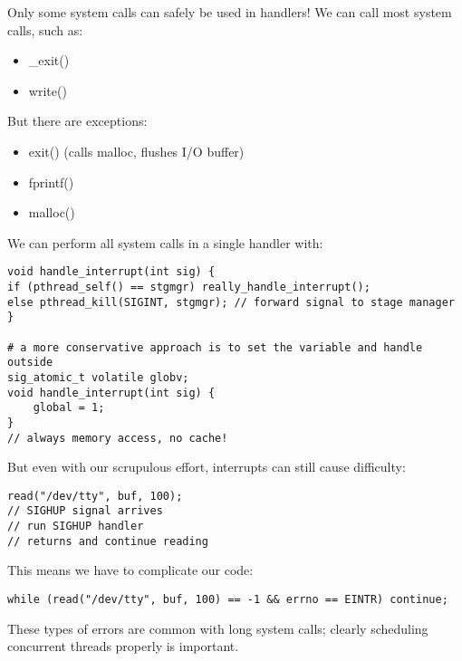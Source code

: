 \documentclass[../../lecture_notes.tex]{subfiles}
\begin{document}
Only some system calls can safely be used in handlers!
We can call most system calls, such as:
\begin{itemize}
\item \_exit()
\item write()
\end{itemize}
But there are exceptions:
\begin{itemize}
\item exit() (calls malloc, flushes I/O buffer)
\item fprintf()
\item malloc()
\end{itemize}

We can perform all system calls in a single handler with:
\begin{lstlisting}
void handle_interrupt(int sig) {
if (pthread_self() == stgmgr) really_handle_interrupt();
else pthread_kill(SIGINT, stgmgr); // forward signal to stage manager
}

# a more conservative approach is to set the variable and handle outside
sig_atomic_t volatile globv;
void handle_interrupt(int sig) {
	global = 1;
}
// always memory access, no cache!
\end{lstlisting}


But even with our scrupulous effort, interrupts can still cause difficulty:
\begin{lstlisting}
read("/dev/tty", buf, 100);
// SIGHUP signal arrives
// run SIGHUP handler
// returns and continue reading
\end{lstlisting}


This means we have to complicate our code:
\begin{lstlisting}
while (read("/dev/tty", buf, 100) == -1 && errno == EINTR) continue;
\end{lstlisting}


These types of errors are common with long system calls; clearly scheduling concurrent threads properly is important.
\end{document}
